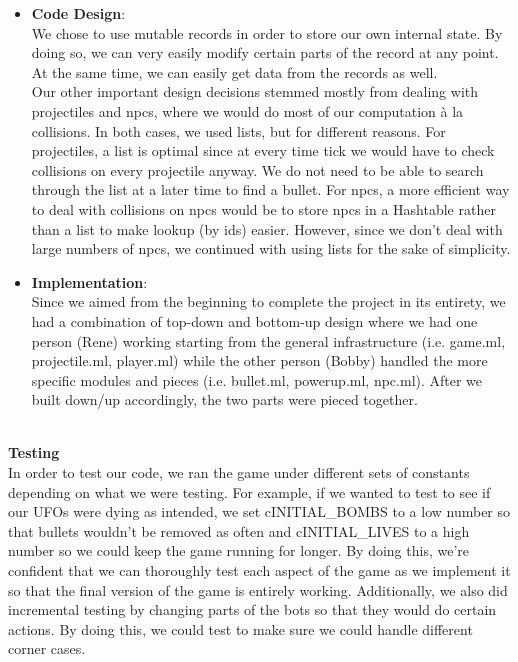 \documentclass{article}[12pt]
\begin{document}
\begin{itemize}
	\item \large{\textbf{Code Design}}: \\
		We chose to use mutable records in order to store our own internal state. By doing so, we can very easily modify certain parts of the record at any point. At the same time, we can easily get data from the records as well. \\
		Our other important design decisions stemmed mostly from dealing with projectiles and npcs, where we would do most of our computation \`{a} la collisions. In both cases, we used lists, but for different reasons. For projectiles, a list is optimal since at every time tick we would have to check collisions on every projectile anyway. We do not need to be able to search through the list at a later time to find a bullet. For npcs, a more efficient way to deal with collisions on npcs would be to store npcs in a Hashtable rather than a list to make lookup (by ids) easier. However, since we don't deal with large numbers of npcs, we continued with using lists for the sake of simplicity.
	\item \large{\textbf{Implementation}}: \\
		Since we aimed from the beginning to complete the project in its entirety, we had a combination of top-down and bottom-up design where we had one person (Rene) working starting from the general infrastructure (i.e. game.ml, projectile.ml, player.ml) while the other person (Bobby) handled the more specific modules and pieces (i.e. bullet.ml, powerup.ml, npc.ml). After we built down/up accordingly, the two parts were pieced together.
\end{itemize}
\hspace*{\fill}\\
\Large{\textbf{Testing}}
\hspace*{\fill}\\
In order to test our code, we ran the game under different sets of constants depending on what we were testing. For example, if we wanted to test to see if our UFOs were dying as intended, we set cINITIAL\_BOMBS to a low number so that bullets wouldn't be removed as often and cINITIAL\_LIVES to a high number so we could keep the game running for longer. By doing this, we're confident that we can thoroughly test each aspect of the game as we implement it so that the final version of the game is entirely working. Additionally, we also did incremental testing by changing parts of the bots so that they would do certain actions. By doing this, we could test to make sure we could handle different corner cases. 
\end{document}
